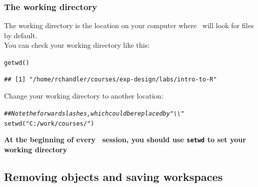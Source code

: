 \documentclass[color=usenames,dvipsnames]{beamer}\usepackage[]{graphicx}\usepackage[]{color}
\makeatletter
\newcommand{\hlstr}[1]{\textcolor[rgb]{0.749,0.012,0.012}{#1}}%
\newcommand{\hlcom}[1]{\textcolor[rgb]{0.514,0.506,0.514}{\textit{#1}}}%
\newcommand{\hlstd}[1]{\textcolor[rgb]{0,0,0}{#1}}%
\newcommand{\hlkwd}[1]{\textcolor[rgb]{0.004,0.004,0.506}{#1}}%
\newenvironment{kframe}{%
 \def\at@end@of@kframe{}%
 \ifinner\ifhmode%
  \def\at@end@of@kframe{\end{minipage}}%
  \begin{minipage}{\columnwidth}%
 \fi\fi%
 \def\FrameCommand##1{\hskip\@totalleftmargin \hskip-\fboxsep
 \colorbox{shadecolor}{##1}\hskip-\fboxsep
     \hskip-\linewidth \hskip-\@totalleftmargin \hskip\columnwidth}%
 \MakeFramed {\advance\hsize-\width
   \@totalleftmargin\z@ \linewidth\hsize
   \@setminipage}}%
 {\par\unskip\endMakeFramed%
 \at@end@of@kframe}
\newenvironment{knitrout}{}{} %
\newcommand{\inr}[1]{\colorbox{inlinecolor}{\texttt{#1}}}
\makeatother
\begin{document}
\begin{frame}[fragile]
  \frametitle{The working directory}
The working directory is the location on your computer where \R~will
look for files by default. \\
\pause \vfill
You can check your working directory like this:
\begin{knitrout}\small
{}\color{fgcolor}\begin{kframe}
\begin{alltt}
\hlkwd{getwd}\hlstd{()}
\end{alltt}
\begin{verbatim}
## [1] "/home/rchandler/courses/exp-design/labs/intro-to-R"
\end{verbatim}
\end{kframe}
\end{knitrout}
\pause \vfill
Change your working directory to another location:
\begin{knitrout}\small
{}\color{fgcolor}\begin{kframe}
\begin{alltt}
\hlcom{## Note the forward slashes, which could be replaced by "\textbackslash{}\textbackslash{}"}
\hlkwd{setwd}\hlstd{(}\hlstr{"C:/work/courses/"}\hlstd{)}
\end{alltt}
\end{kframe}
\end{knitrout}
\pause \vfill
\centering
{\bf At the beginning of every \R~session, you should use
  \inr{setwd} to set your working directory \\}
\end{frame}








\subsection{Removing objects and saving workspaces}
\end{document}
